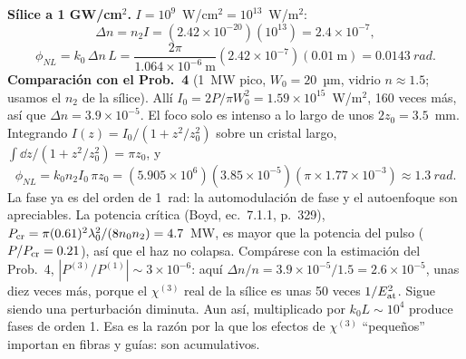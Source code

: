  \textbf{Sílice a 1 GW/cm$^2$.} $I=10^9$~W/cm$^2=10^{13}$~W/m$^2$:
\[
\Delta n=n_2I=(2.42\times10^{-20})(10^{13})=2.4\times10^{-7},
\]
\[
\phi_{NL}=k_0\,\Delta n\,L=\frac{2\pi}{1.064\times10^{-6}\ \mathrm m}(2.42\times10^{-7})(0.01\ \mathrm m)=\SI{0.0143}{rad}.
\]
\textbf{Comparación con el Prob.~4} (1~MW pico, $W_0=20$~µm, vidrio $n\approx1.5$; usamos el $n_2$ de la sílice). Allí
$I_0=2P/\pi W_0^2=1.59\times10^{15}$~W/m$^2$, 160 veces más, así que $\Delta n=3.9\times10^{-5}$. El foco solo es intenso a lo largo de unos $2z_0=3.5$~mm. Integrando
$I(z)=I_0/(1+z^2/z_0^2)$ sobre un cristal largo, $\int\dd z/(1+z^2/z_0^2)=\pi z_0$, y
\[
\phi_{NL}=k_0n_2I_0\,\pi z_0=(5.905\times10^6)(3.85\times10^{-5})(\pi\times1.77\times10^{-3})\approx\SI{1.3}{rad}.
\]
La fase ya es del orden de 1~rad: la automodulación de fase y el autoenfoque son apreciables. La potencia crítica (Boyd, ec.~7.1.1, p.~329),
$P_{\rm cr}=\pi(0.61)^2\lambda_0^2/(8n_0n_2)=4.7$~MW, es mayor que la potencia del pulso ($P/P_{\rm cr}=0.21$), así que el haz no colapsa. Compárese con la
estimación del Prob.~4, $|P^{(3)}/P^{(1)}|\sim3\times10^{-6}$: aquí $\Delta n/n=3.9\times10^{-5}/1.5=2.6\times10^{-5}$, unas diez veces más, porque el
$\chi^{(3)}$ real de la sílice es unas 50 veces $1/E_{\rm at}^2$. Sigue siendo una perturbación diminuta. Aun así, multiplicado por $k_0L\sim10^4$ produce fases de orden 1. Esa es la razón por la que los efectos de $\chi^{(3)}$ ``pequeños'' importan en
fibras y guías: son acumulativos.

